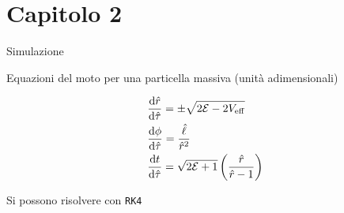 
\section{Capitolo 2}

\begin{frame}{Simulazione}

    Equazioni del moto per una particella massiva (unità adimensionali)

	\begin{align*}[left = {\empheqlbrace}]
        &\dv{\hat r}{\hat \tau} = \pm \sqrt{2 \mathcal E - 2 V_{\rm eff}} \\
        &\dv{\phi}{\hat \tau} = \frac{\hat \ell}{\hat r^2} \\
        &\dv{t}{\hat \tau} = \sqrt{2 \mathcal E + 1}
        \left(\frac{\hat r}{\hat r - 1}\right) 
	\end{align*}

    Si possono risolvere con \texttt{RK4}

\end{frame}


